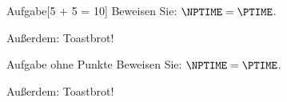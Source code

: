 \documentclass
[
    lang=de,
    folder=../style,
    a4paper,
    12pt,
    parskip=half-,
    numbers=enddot,
    fleqn,
]{../style/smexam}
\begin{document}
\begin{exam}
    \newpage

    \begin{exercise}{Aufgabe}[5 + 5 = 10]
        Beweisen Sie: $\NPTIME = \PTIME$.

        Außerdem: Toastbrot!
    \end{exercise}

    \newpage

    \begin{exercise}{Aufgabe ohne Punkte}
        Beweisen Sie: $\NPTIME = \PTIME$.

        Außerdem: Toastbrot!
    \end{exercise}


    \end{exam}
\end{document}
